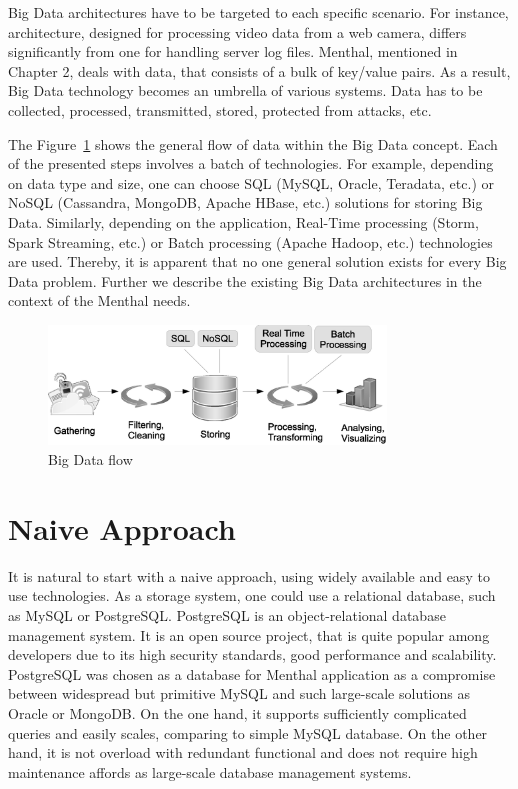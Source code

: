 Big Data architectures have to be targeted to each specific scenario.
For instance, architecture, designed for processing video data from a web camera, differs significantly from one for handling server log files.
Menthal, mentioned in Chapter 2, deals with data, that consists of a bulk of key/value pairs. 
As a result, Big Data technology becomes an umbrella of various systems. 
Data has to be collected, processed, transmitted, stored, protected from attacks, etc.

The Figure~\ref{fig:big_data_flow} shows the general flow of data within the Big Data concept.
Each of the presented steps involves a batch of technologies.
For example, depending on data type and size, one can choose SQL (MySQL, Oracle, Teradata, etc.) or NoSQL (Cassandra, MongoDB, Apache HBase, etc.) solutions for storing Big Data.
Similarly, depending on the application, Real-Time processing (Storm, Spark Streaming, etc.) or Batch processing (Apache Hadoop, etc.) technologies are used. 
Thereby, it is apparent that no one general solution exists for every Big Data problem.
Further we describe the existing Big Data architectures in the context of the Menthal needs.

\begin{figure}
  \centering
  \includegraphics [width=0.8\textwidth]{images/big_data_flow}
  \caption{Big Data flow}
  \label{fig:big_data_flow}
\end{figure}

\section{Naive Approach}

It is natural to start with a naive approach, using widely available and easy to use technologies.
As a storage system, one could use a relational database, such as MySQL or PostgreSQL.
PostgreSQL is an object-relational database management system.
It is an open source project, that is quite popular among developers due to its high security standards, good performance and scalability.
PostgreSQL was chosen as a database for Menthal application as a compromise between widespread but primitive MySQL and such large-scale solutions as Oracle or MongoDB.
On the one hand, it supports sufficiently complicated queries and easily scales, comparing to simple MySQL database.
On the other hand, it is not overload with redundant functional and does not require high maintenance affords as large-scale database management systems.

